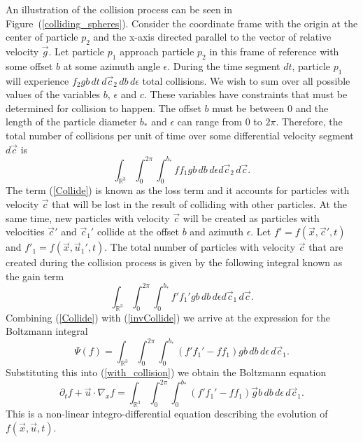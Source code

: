 \FloatBarrier
An illustration of the collision process can be seen in Figure~(\ref{colliding_spheres}). Consider the coordinate frame with the origin at the center of particle $p_2$ and the x-axis directed parallel to the vector of relative velocity $\vec{g}$. Let particle $p_1$ approach particle $p_2$ in this frame of reference with some offset $b$ at some azimuth angle $\epsilon$. During the time segment $dt$, particle $p_1$ will experience $f_2 g b \, dt \, d\vec{c}_2 \, db \, d\epsilon$ total collisions. We wish to sum over all possible values of the variables $b$, $\epsilon$ and $c$. These variables have constraints that must be determined for collision to happen. The offset $b$ must be between $0$ and the length of the particle diameter $b_*$ and $\epsilon$ can range from $0$ to $2 \pi$. Therefore, the total number of collisions per unit of time over some differential velocity segment $d\vec{c}$ is
%
\begin{equation}
\label{Collide}
\int_{\mathbb{R}^3} \int_0^{2 \pi} \int_0^{b_*} f f_1 g b \, db \, d\epsilon d\vec{c}_2 \, d\vec{c}.
\end{equation}
%
The term (\ref{Collide}) is known as the loss term and it accounts for particles with velocity $\vec{c}$ that will be lost in the result of colliding with other particles. At the same time, new particles with velocity $\vec{c}$ will be created as particles with velocities $\vec{c}'$ and $\vec{c}_1'$ collide at the offset $b$ and azimuth $\epsilon$. Let $f'=f(\vec{x},\vec{c}',t)$ and $f'_1=f(\vec{x},\vec{u}_1',t)$. The total number of particles with velocity $\vec{c}$ that are created during the collision process is given by the following integral known as the gain term
%
\begin{equation}
\label{invCollide}
\int_{\mathbb{R}^3} \int_0^{2 \pi} \int_0^{b_*} f' f_1' g b \, db \, d\epsilon d\vec{c}_1 \, d\vec{c}.
\end{equation}
%
Combining (\ref{Collide}) with (\ref{invCollide}) we arrive at the expression for the Boltzmann integral
%
\begin{equation*}
\label{BoltzmannRHS}
\Psi(f) = \int_{\mathbb{R}^3} \int_0^{2 \pi} \int_0^{b_*} \left( f' f_1' - f f_1 \right) g b \, db \, d\epsilon \, d\vec{c}_1.
\end{equation*}
%
Substituting this into (\ref{with_collision}) we obtain the Boltzmann equation
%
\begin{equation*}
\partial_t f + \vec{u} \cdot \nabla_x f = \int_{\mathbb{R}^3} \int_0^{2 \pi} \int_0^{b_*} \left( f' f_1' - f f_1 \right) \vec{g} b \, db \, d\epsilon \, d\vec{c}_1.
\end{equation*}
%
This is a non-linear integro-differential equation describing the evolution of $f(\vec{x},\vec{u},t)$.
